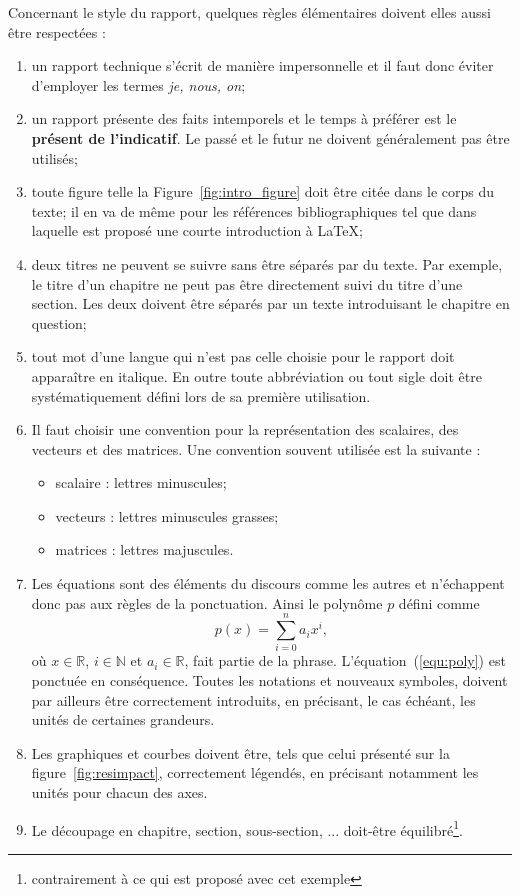 \documentclass[a4paper,11pt]{scrbook}
\newcommand{\Figure}[1]{Figure~\ref{#1}}
\begin{document}
Concernant le style du rapport, quelques règles élémentaires doivent elles aussi être respectées :
\begin{enumerate}
\item un rapport technique s'écrit de manière impersonnelle et il faut donc éviter d'employer les termes \textit{je, nous, on};
\item un rapport présente des faits intemporels et le temps à préférer est le \textbf{présent de l'indicatif}. Le passé et le futur ne doivent généralement pas être utilisés;
\item toute figure telle la \Figure{fig:intro_figure} doit être citée dans le corps du texte; il en va de même pour les références bibliographiques tel que \cite{Oetiket} dans laquelle est proposé une courte introduction à \LaTeX;
\item deux titres ne peuvent se suivre sans être séparés par du texte. Par exemple, le titre d'un chapitre ne peut pas être directement suivi du titre d'une section. Les deux doivent être séparés par un texte introduisant le chapitre en question;
\item tout mot d'une langue qui n'est pas celle choisie pour le rapport doit apparaître en italique. En outre toute abbréviation ou tout sigle doit être systématiquement défini lors de sa première utilisation.
\item Il faut choisir une convention pour la représentation des scalaires, des vecteurs et des matrices. Une convention souvent utilisée est la suivante :
	\begin{itemize}
	\item scalaire : lettres minuscules;
	\item vecteurs : lettres minuscules grasses;
	\item matrices : lettres majuscules.
	\end{itemize}
\item Les équations sont des éléments du discours comme les autres et n'échappent donc pas aux règles de la ponctuation. Ainsi le polynôme $p$ défini comme
\begin{equation}
p(x) = \sum_{i=0}^n a_i x^i, \label{equ:poly}
\end{equation}
où $x \in \mathbb{R}$, $i \in \mathbb{N}$ et $a_i \in \mathbb{R}$, fait partie de la phrase. L'équation~(\ref{equ:poly}) est ponctuée en conséquence. Toutes les notations et nouveaux symboles, doivent par ailleurs être correctement introduits, en précisant, le cas échéant, les unités de certaines grandeurs.
\item Les graphiques et courbes doivent être, tels que celui présenté sur la figure~\ref{fig:resimpact}, correctement légendés, en précisant notamment les unités pour chacun des axes.
\item Le découpage en chapitre, section, sous-section, ... doit-être équilibré\footnote{contrairement à ce qui est proposé avec cet exemple}.
\end{enumerate}
\end{document}
